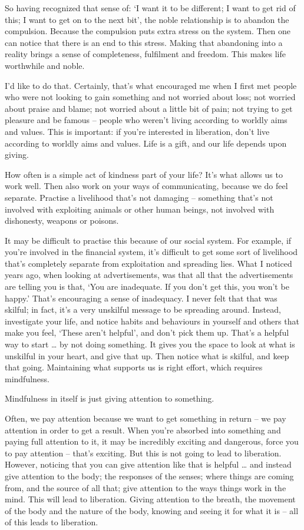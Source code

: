 So having recognized that sense of: `I want it to be different; I want to get
rid of this; I want to get on to the next bit', the noble relationship is to
abandon the compulsion. Because the compulsion puts extra stress on the system.
Then one can notice that there is an end to this stress. Making that abandoning
into a reality brings a sense of completeness, fulfilment and freedom. This
makes life worthwhile and noble.

I'd like to do that. Certainly, that's what encouraged me when I first met
people who were not looking to gain something and not worried about loss; not
worried about praise and blame; not worried about a little bit of pain; not
trying to get pleasure and be famous -- people who weren't living according to
worldly aims and values. This is important: if you're interested in liberation,
don't live according to worldly aims and values. Life is a gift, and our life
depends upon giving.

How often is a simple act of kindness part of your life? It's what allows us to
work well. Then also work on your ways of communicating, because we do feel
separate. Practise a livelihood that's not damaging -- something that's not
involved with exploiting animals or other human beings, not involved with
dishonesty, weapons or poisons.

It may be difficult to practise this because of our social system. For example,
if you're involved in the financial system, it's difficult to get some sort of
livelihood that's completely separate from exploitation and spreading lies. What
I noticed years ago, when looking at advertisements, was that all that the
advertisements are telling you is that, `You are inadequate. If you don't get
this, you won't be happy.' That's encouraging a sense of inadequacy. I never
felt that that was skilful; in fact, it's a very unskilful message to be
spreading around. Instead, investigate your life, and notice habits and
behaviours in yourself and others that make you feel, `These aren't helpful',
and don't pick them up. That's a helpful way to start \ldots{} by not doing
something. It gives you the space to look at what is unskilful in your heart,
and give that up. Then notice what is skilful, and keep that going. Maintaining
what supports us is right effort, which requires mindfulness.

Mindfulness in itself is just giving attention to something.

Often, we pay attention because we want to get something in return -- we pay
attention in order to get a result. When you're absorbed into something and
paying full attention to it, it may be incredibly exciting and dangerous, force
you to pay attention -- that's exciting. But this is not going to lead to
liberation. However, noticing that you can give attention like that is helpful
\ldots{} and instead give attention to the body; the responses of the senses;
where things are coming from, and the source of all that; give attention to the
ways things work in the mind. This will lead to liberation. Giving attention to
the breath, the movement of the body and the nature of the body, knowing and
seeing it for what it is -- all of this leads to liberation.

